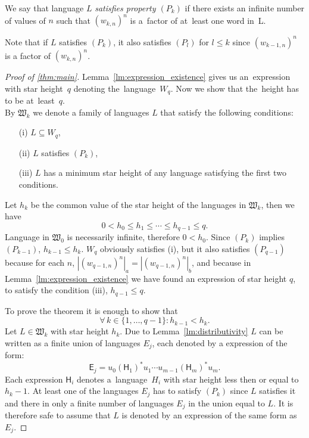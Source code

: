 \begin{defn}
    We say that language $L$ \emph{satisfies property $(P_k)$} if there exists an infinite number of values of $n$ such that ${(w_{k,n})}^n$ is a~factor of at~least one word in~L.
\end{defn}

Note that if $L$ satisfies $(P_k)$, it also satisfies $(P_l)$ for $l \leq k$ since ${(w_{k-1,n})}^n$ is a factor of ${(w_{k,n})}^n$.

\begin{proof}[Proof of \autoref*{thm:main}]
    Lemma~\ref*{lm:expression_existence} gives us an~expression with star height~$q$ denoting the~language~$W_q$. Now we show that the~height has to be at~least~$q$.\\
    By $\mathfrak{W}_k$ we denote a family of languages $L$ that satisfy the following conditions:
    \begin{enumerate}
        \item[(i)] $L \subseteq W_q$,
        \item[(ii)] $L$ satisfies $(P_k)$,
        \item[(iii)] $L$ has a minimum star height of any language satisfying the first two conditions.
    \end{enumerate}
    Let $h_k$ be the common value of the star height of the languages in $\mathfrak{W}_k$, then we have
    \[
        0 < h_0 \leq h_1 \leq \dotsb \leq h_{q-1} \leq q.
    \]
    Language in $\mathfrak{W}_0$ is necessarily infinite, therefore $0 < h_0$. Since $(P_k)$ implies $(P_{k-1})$, $h_{k-1} \leq h_k$. $W_q$ obviously satisfies (i), but it also satisfies $(P_{q-1})$ because for each $n$, $|{(w_{q-1,n})}^n|_a = |{(w_{q-1,n})}^n|_b$, and because in Lemma~\ref*{lm:expression_existence} we have found an expression of star height $q$, to satisfy the condition (iii), $h_{q-1} \leq q$.

    To prove the theorem it is enough to show that
    \[
        \forall \, k \in \{1,\dotsc,q-1\}: h_{k-1} < h_k.
    \]
    Let $L \in \mathfrak{W}_k$ with star height $h_k$. Due to Lemma~\ref*{lm:distributivity} $L$ can be written as a finite union of languages $E_j$, each denoted by a expression of the form:
    \[
        \mathsf{E}_j = u_0{(\mathsf{H}_1)}^*u_1 \dotsm u_{m-1}{(\mathsf{H}_m)}^*u_m.
    \]
    Each expression $\mathsf{H}_i$ denotes a~language~$H_i$ with star height less then or equal to $h_k-1$. At least one of the languages $E_j$ has to satisfy $(P_k)$ since $L$ satisfies it and there in only a finite number of languages $E_j$ in the union equal to $L$. It is therefore safe to assume that $L$ is denoted by an expression of the same form as $E_j$.


\end{proof}

